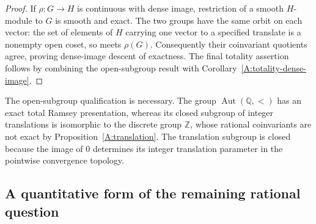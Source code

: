\begin{proof}
If $\rho:G\to H$ is continuous with dense image, restriction
of a smooth $H$-module to $G$ is smooth and exact. The two
groups have the same orbit on each vector: the set of elements
of $H$ carrying one vector to a specified translate is a
nonempty open coset, so meets $\rho(G)$. Consequently their
coinvariant quotients agree, proving dense-image descent of
exactness. The final totality assertion follows by combining
the open-subgroup result with
Corollary~\ref{A:totality-dense-image}.
\end{proof}

The open-subgroup qualification is necessary. The group
$\operatorname{Aut}(\mathbb Q,<)$ has an exact total Ramsey
presentation, whereas its closed subgroup of integer
translations is isomorphic to the discrete group $\mathbb Z$,
whose rational coinvariants are not exact by
Proposition~\ref{A:translation}. The translation subgroup is
closed because the image of $0$ determines its integer
translation parameter in the pointwise convergence topology.

\subsection{A quantitative form of the remaining rational question}

